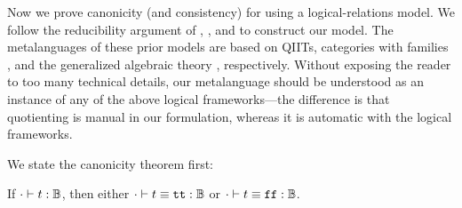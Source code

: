 Now we prove canonicity (and consistency) for \TT using a logical-relations model.
We follow the reducibility argument of
\citet{kaposi2019gluing}, \citet{coquand2018canonicity}, and \citet{sterling2019algebraic}
to construct our model.
The meta\-languages of these prior models are based on QIITs, categories with
families \cite{dybjer1995internal}, and the generalized algebraic theory
\cite{cartmell1986generalised}, respectively.
Without exposing the reader to too many technical details, our meta\-language
should be understood as an instance of any of the above logical frameworks---the
difference is that quotienting is manual in our formulation, whereas it is
automatic with the logical frameworks.

We state the canonicity theorem first:

\begin{theorem}[Canonicity]
\label{thm:canonicity-appendix}
  If $ {\cdot} \vdash {t} : {\mathbb{B}} $, then either $ {\cdot} \vdash {t \equiv \ensuremath{\texttt{tt}}} : {\mathbb{B}} $ or $ {\cdot} \vdash {t \equiv \ensuremath{\texttt{ff}}} : {\mathbb{B}} $.
\end{theorem}


